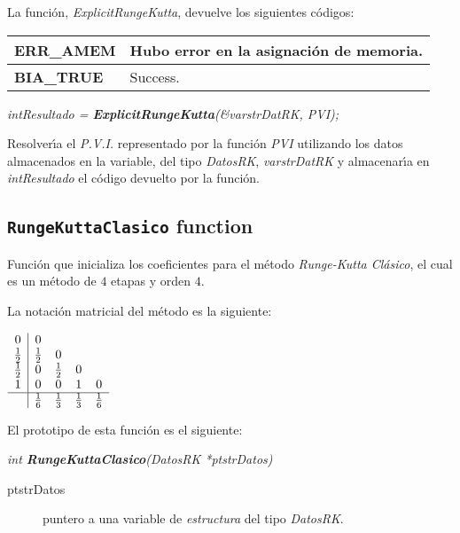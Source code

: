 La funci\'on, \emph{ExplicitRungeKutta}, devuelve los siguientes c\'odigos:

\begin{center}
\begin{tabular}{|l|l|}
\hline
\textbf{ERR\_AMEM} & Hubo error en la asignaci\'on de memoria. \\
\hline
\textbf{BIA\_TRUE} & Success. \\
\hline
\end{tabular}
\end{center}

\begin{center}
\emph{intResultado = \textbf{ExplicitRungeKutta}(\&varstrDatRK, PVI);}
\end{center}

Resolver\'{\i}a el \emph{P.V.I.} representado por la funci\'on \emph{PVI} 
utilizando los datos almacenados en la variable, del tipo \emph{DatosRK},
\emph{varstrDatRK} y almacenar\'{\i}a en \emph{intResultado} el c\'odigo
devuelto por la funci\'on.

\subsection{\texttt{RungeKuttaClasico} function}

Funci\'on que inicializa los coeficientes para el m\'etodo \emph{Runge-Kutta 
Cl\'asico}, el cual es un m\'etodo de $4$ etapas y orden $4$.\newline

La notaci\'on matricial del m\'etodo es la siguiente:

\begin{center}
$
\begin{array}{c|cccc}
0 & 0 \\
\frac{1}{2} & \frac{1}{2} & 0 \\
\frac{1}{2} & 0 & \frac{1}{2} & 0 \\
1 & 0 & 0 & 1 & 0 \\
\hline
 & \frac{1}{6} & \frac{1}{3} & \frac{1}{3} & \frac{1}{6} \\
\end{array}
$
\end{center}

El prototipo de esta funci\'on es el siguiente:

\begin{center}
\emph{int \textbf{RungeKuttaClasico}(DatosRK *ptstrDatos)}
\end{center}

\begin{description}
\item[ptstrDatos] puntero a una variable de \emph{estructura} del tipo
\emph{DatosRK}.
\end{description}

